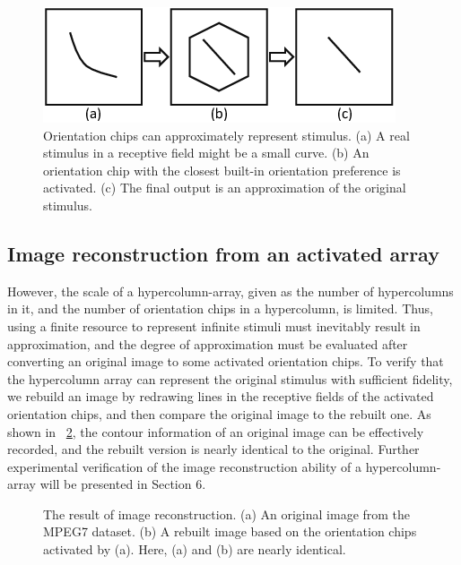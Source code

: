 \documentclass[journal]{IEEEtran}
\begin{document}
\begin{figure}[!t]
\centering
\includegraphics[width=0.45\linewidth]{images/fig6.png}
\caption{Orientation chips can approximately represent stimulus. 
(a) A real stimulus in a receptive field might be a small curve. 
(b) An orientation chip with the closest built-in orientation preference is activated. 
(c) The final output is an approximation of the original stimulus.}
\label{fig:6}
\end{figure}

\subsection{Image reconstruction from an activated array}

However, the scale of a hypercolumn-array, given as the number of hypercolumns in it, 
and the number of orientation chips in a hypercolumn, is limited. 
Thus, using a finite resource to represent infinite stimuli must inevitably result in approximation, 
and the degree of approximation must be evaluated after converting an original image to some activated orientation chips. 
To verify that the hypercolumn array can represent the original stimulus with sufficient fidelity, 
we rebuild an image by redrawing lines in the receptive fields of the activated orientation chips, 
and then compare the original image to the rebuilt one. 
As shown in \figurename~\ref{fig:7}, 
the contour information of an original image can be effectively recorded, 
and the rebuilt version is nearly identical to the original. 
Further experimental verification of the image reconstruction ability of a hypercolumn-array will be presented in Section 6.

\begin{figure}[!t]
\centering
{}
\hfil
{}
\caption{The result of image reconstruction. (a) An original image from the MPEG7 dataset. (b) A rebuilt image based on the orientation chips activated by (a). Here, (a) and (b) are nearly identical.}
\label{fig:7}
\end{figure}
\end{document}
